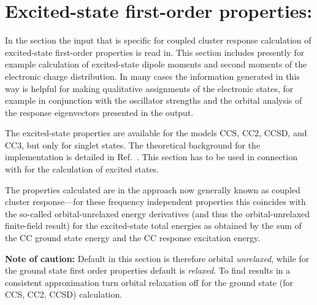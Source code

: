 
\section{Excited-state first-order properties: }\label{sec:ccexgr}

In the  section the input that is specific for coupled cluster 
response calculation of excited-state first-order properties is read in.
This section includes presently for example calculation of excited-state 
dipole moments and second moments of the electronic charge distribution.
In many cases the information generated in this way is helpful 
for making qualitative assignments of the electronic states, for example
in conjunction with the oscillator strengths and the 
orbital analysis of the response eigenvectors presented in the output.

The excited-state properties are available for the models CCS, CC2, CCSD, and CC3,
but only for singlet states.
The theoretical background for the implementation is detailed in Ref.\ \cite{Christiansen:CCLR,Christiansen:QEL}.
This section has to be used in connection with  for the calculation of excited states.

The properties calculated are in the approach now generally known as coupled cluster
response---for these frequency independent properties this coincides with the so-called
orbital-unrelaxed energy derivatives (and thus the orbital-unrelaxed finite-field result)
for the excited-state total energies as obtained by the sum of the CC ground state energy
and the CC response excitation energy.

{\bf Note of caution:}
Default in this section is therefore orbital {\it unrelaxed}, while for the ground state 
first order properties  default is {\it relaxed}. 
To find results in a consistent approximation turn orbital relaxation off
for the ground state (for CCS, CC2, CCSD) calculation.

\begin{center}
\end{center}

